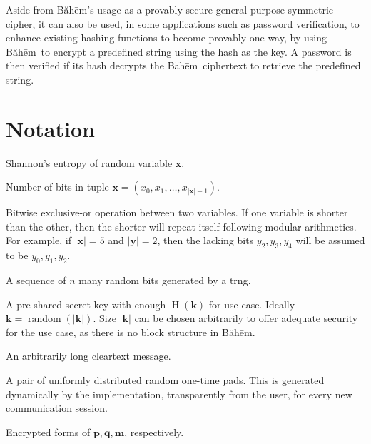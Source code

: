 \documentclass[twocolumn]{article}
\newcommand{\baheem}{Băhēm}
\DeclareMathOperator{\random}{random}
\DeclareMathOperator{\entropy}{H}
\begin{document}
Aside from \baheem's usage as a provably-secure general-purpose symmetric
cipher, it can also be used, in some applications such as password
verification, to enhance existing hashing functions to become provably
one-way, by using \baheem\ to encrypt a predefined string using the hash as
the key.  A password is then verified if its hash decrypts the \baheem\
ciphertext to retrieve the predefined string.

\section*{Notation}
\begin{description}[itemsep=0em]
    \item[$\entropy(\mathbf{x})$] Shannon's entropy of random variable
        $\mathbf{x}$.
    \item[$|\mathbf{x}|$] Number of bits in tuple $\mathbf{x} = (x_0, x_1,
        \ldots, x_{|\mathbf{x}|-1})$.
    \item[$\mathbf{x} \oplus \mathbf{y}$] Bitwise exclusive-or operation
        between two variables.  If one variable is shorter than the other,
        then the shorter will repeat itself following modular arithmetics.
        For example, if $|\mathbf{x}| = 5$ and $|\mathbf{y}|=2$, then the
        lacking bits $y_2, y_3, y_4$ will be assumed to be $y_0, y_1, y_2$.
    \item[$\random(n) = (r_0, r_1, \ldots, r_n)$] A sequence of $n$ many
        random bits generated by a \gls{trng}.
    \item[$\mathbf{k} = (k_0, k_1, \ldots, k_{|\mathbf{k}|-1})$] A
        pre-shared secret key with enough $\entropy(\mathbf{k})$ for use
        case.  Ideally $\mathbf{k} = \random(|\mathbf{k}|)$.  Size
        $|\mathbf{k}|$ can be chosen arbitrarily to offer adequate security
        for the use case, as there is no block structure in \baheem.
    \item[$\mathbf{m} = (m_0, m_1, \ldots, m_{|\mathbf{m}|-1})$] An
        arbitrarily long cleartext message.
    \item[$\mathbf{p} = \random(|\mathbf{m}|), \mathbf{q} =
        \random(|\mathbf{m}|)$] A pair of uniformly distributed random
        one-time pads.  This is generated dynamically by the
        implementation, transparently from the user, for every new
        communication session.
    \item[$\mathbf{\hat p}, \mathbf{\hat q}, \mathbf{\hat m}$] Encrypted
        forms of $\mathbf{p}, \mathbf{q}, \mathbf{m}$, respectively.
\end{description}
\end{document}
